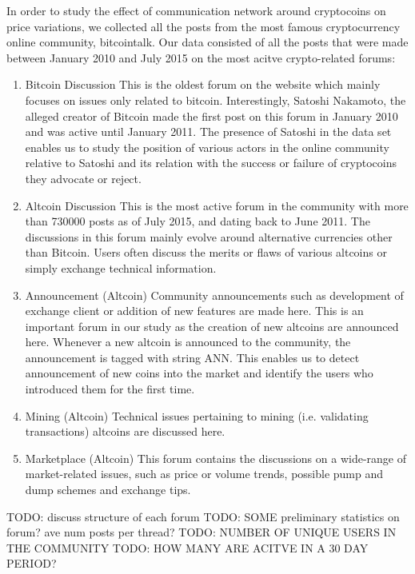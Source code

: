 In order to study the effect of communication network around cryptocoins on
price variations, we collected all the posts from the most famous cryptocurrency
online community, bitcointalk.  Our data consisted of all the posts that were
made between January 2010 and July 2015 on the most acitve crypto-related forums:
\begin{enumerate}
  \item{Bitcoin Discussion} This is the oldest forum on the website which mainly focuses
    on issues only related to bitcoin. Interestingly, Satoshi Nakamoto, the alleged
    creator of Bitcoin made the first post on this forum in January 2010 and
    was active until January 2011. The presence of Satoshi in the data set enables us
    to study the position of various actors in the online community relative to Satoshi
    and its relation with the success or failure of cryptocoins they advocate or reject.

  \item{Altcoin Discussion} This is the most active forum in the community
    with more than 730000 posts as of July 2015, and dating back to June 2011.
    The discussions in this forum mainly evolve around alternative currencies
    other than Bitcoin. Users often discuss the merits or flaws of various
    altcoins or simply exchange technical information.
  
  \item{Announcement (Altcoin)} Community announcements such as development of 
    exchange client or addition of new features are made here. This is an important forum
    in our study as the creation of new altcoins are announced here. Whenever a new
    altcoin is announced to the community, the announcement is tagged with string ANN.
    This enables us to detect announcement of new coins into the market and identify
    the users who introduced them for the first time.

  \item{Mining (Altcoin)} Technical issues pertaining to mining (i.e. validating transactions)
    altcoins are discussed here.
  \item{Marketplace (Altcoin)} This forum contains the discussions on a wide-range of 
    market-related issues, such as price or volume trends, possible pump and dump schemes
    and exchange tips.

\end{enumerate}

TODO: discuss structure of each forum
TODO: SOME preliminary statistics on forum? ave num posts per thread?
TODO: NUMBER OF UNIQUE USERS IN THE COMMUNITY
TODO: HOW MANY ARE ACITVE IN A 30 DAY PERIOD?

